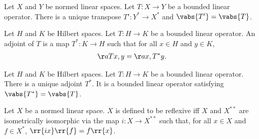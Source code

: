 \documentclass{article}
\begin{document}
\begin{corollary}
  Let $X$ and $Y$ be normed linear spaces. Let $T:X\to Y$ be a bounded linear operator.
  There is a unique transpose $T':Y^*\to X^*$ and $\vabs{T'}=\vabs{T}$.
\end{corollary}

\begin{definition}[Adjoints]
  Let $H$ and $K$ be Hilbert spaces. Let $T:H\to K$ be a bounded linear operator. An
  adjoint of $T$ is a map $T^*:K\to H$ such that for all $x\in H$ and $y\in K$,
  \begin{align*}
    \aa{Tx,y}=\aa{x,T^*y}.
  \end{align*}
\end{definition}

\begin{theorem}
  Let $H$ and $K$ be Hilbert spaces. Let $T:H\to K$ be a bounded linear operator. There is
  a unique adjoint $T^*$. It is a bounded linear operator satisfying $\vabs{T^*}=\vabs{T}$.
\end{theorem}

\begin{definition}
  Let $X$ be a normed linear space. $X$ is defined to be reflexive iff $X$ and $X^{**}$ are
  isometrically isomorphic via the map $i:X\to X^{**}$ such that, for all $x\in X$ and $f\in X^*$,
  $\rr{ix}\rr{f}=f\rr{x}$.
\end{definition}
\end{document}
